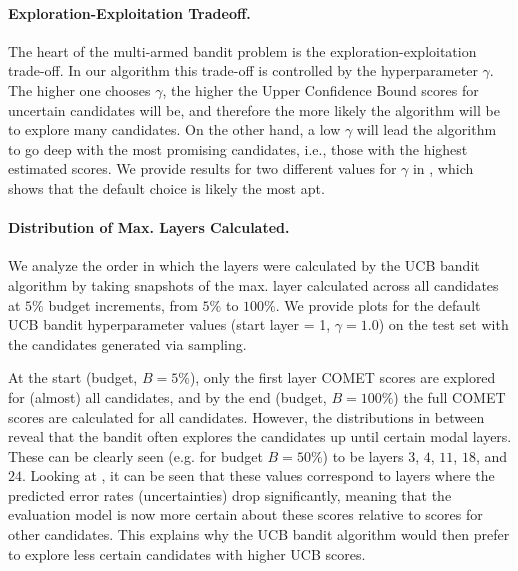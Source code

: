 \paragraph{Exploration-Exploitation Tradeoff.}
The heart of the multi-armed bandit problem is the exploration-exploitation trade-off.
In our algorithm this trade-off is controlled by the hyperparameter $\gamma$.
The higher one chooses $\gamma$, the higher the Upper Confidence Bound scores for uncertain candidates will be, and therefore the more likely the algorithm will be to explore many candidates.
On the other hand, a low $\gamma$ will lead the algorithm to go deep with the most promising candidates, i.e., those with the highest estimated scores. 
We provide results for two different values for $\gamma$ in , which shows that the default choice is likely the most apt.

\paragraph{Distribution of Max. Layers Calculated.}
We analyze the order in which the layers were calculated by the UCB bandit algorithm by taking snapshots of the max. layer calculated across all candidates at $5\%$ budget increments, from $5\%$ to $100\%$. We provide plots for the default UCB bandit hyperparameter values (start layer = 1, $\gamma = 1.0$) on the test set with the candidates generated via sampling. 

At the start (budget, $B=5\%$), only the first layer COMET scores are explored for (almost) all candidates, and by the end (budget, $B=100\%$) the full COMET scores are calculated for all candidates.
However, the distributions in between reveal that the bandit often explores the candidates up until certain modal layers. These can be clearly seen (e.g. for budget $B=50\%$) to be layers $3$, $4$, $11$, $18$, and $24$. Looking at , it can be seen that these values correspond to layers where the predicted error rates (uncertainties) drop significantly, meaning that the evaluation model is now more certain about these scores relative to scores for other candidates. This explains why the UCB bandit algorithm would then prefer to explore less certain candidates with higher UCB scores.













